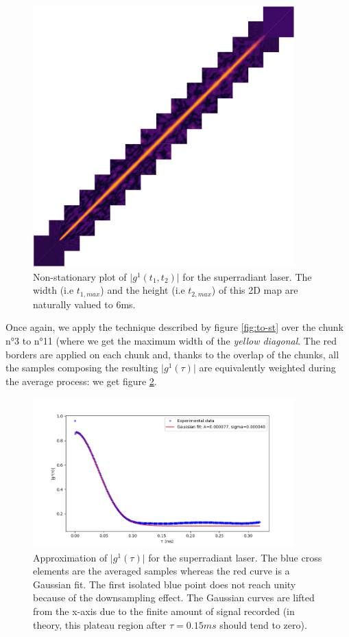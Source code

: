 \documentclass[11pt]{report}
\begin{document}
\begin{figure}[h!]
\centering
\includegraphics[width=0.9\textwidth]{medley}
\caption{Non-stationary plot of  $\vert g^1(t_1, t_2) \vert$ for the superradiant laser. The width (i.e $t_{1, max}$) and the height (i.e $t_{2, max}$) of this 2D map are naturally valued to 6ms.}
\label{fig:medley}
\end{figure}

Once again, we apply the technique described by figure \ref{fig:to-st} over the chunk n°3 to n°11 (where we get the maximum width of the \textit{yellow diagonal}. The red borders are applied on each chunk and, thanks to the overlap of the chunks, all the samples composing the resulting $\vert g^1(\tau) \vert$ are equivalently weighted during the average process: we get figure \ref{fig:sp-stat}.

\begin{figure}[h!]
\centering
\includegraphics[width=0.9\textwidth]{sp-stat}
\caption{Approximation of $\vert g^1(\tau) \vert$ for the superradiant laser. The blue cross elements are the averaged samples whereas the red curve is a Gaussian fit. The first isolated blue point does not reach unity because of the downsampling effect. The Gaussian curves are lifted from the x-axis due to the finite amount of signal recorded (in theory, this plateau region after $\tau=0.15ms$ should tend to zero).}
\label{fig:sp-stat}
\end{figure}
\end{document}
